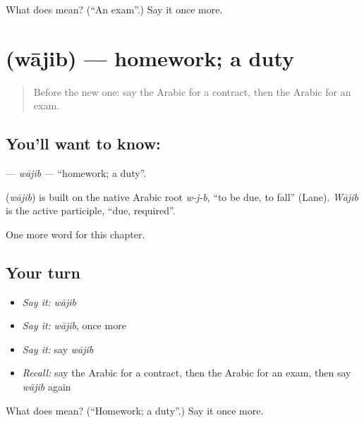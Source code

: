 \begin{tcolorbox}[breakable,colback=teal!4,colframe=teal!35!black,title={Before you move on}]
What does  mean? (\textquotedblleft{}An exam\textquotedblright{}.) Say it once more.
\end{tcolorbox}
\section[\texorpdfstring{\ar{واجب} (wājib)}{واجب (wājib)}]{ (wājib) — homework; a duty}

\label{lesson:AR-C221-wajib}



\begin{quote}
Before the new one: say the Arabic for a contract, then the Arabic for an exam.
\end{quote}

\subsection*{You'll want to know: }
\textbf{} — \emph{wājib} — \textquotedblleft{}homework; a duty\textquotedblright{}.

\begin{cousinweb}
\textbf{} (\emph{wājib}) is built on the native Arabic root \emph{w-j-b}, \textquotedblleft{}to be due, to fall\textquotedblright{} (Lane). \emph{Wājib} is the active participle, \textquotedblleft{}due, required\textquotedblright{}.
\end{cousinweb}

\begin{grammarlens}[title={What you've built}]
One more word for this chapter.
\end{grammarlens}

\subsection*{Your turn}
\begin{itemize}
\raggedright
  \item \emph{Say it:} \emph{wājib}
  \item \emph{Say it:} \emph{wājib}, once more
  \item \emph{Say it:} say \emph{wājib}
  \item \emph{Recall:} say the Arabic for a contract, then the Arabic for an exam, then say \emph{wājib} again
\end{itemize}

\begin{tcolorbox}[breakable,colback=teal!4,colframe=teal!35!black,title={Before you move on}]
What does  mean? (\textquotedblleft{}Homework; a duty\textquotedblright{}.) Say it once more.
\end{tcolorbox}
